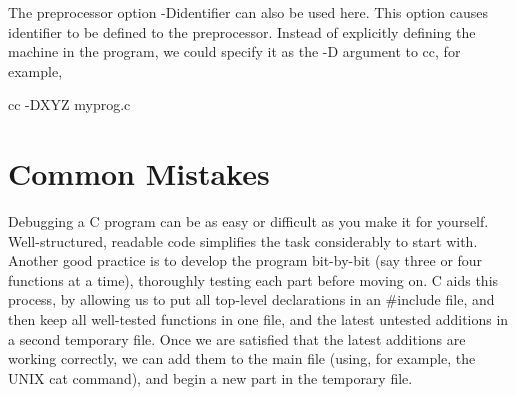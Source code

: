     The preprocessor option {\cmd -D}{\ms identifier\/} can also be
used here. This option causes {\ms identifier\/} to be defined to the
preprocessor. Instead of explicitly defining the  machine in  the
program,  we could specify it as the {\cmd -D} argument to {\cmd cc}, 
for example, 
\begin{display}\cmd
 cc -DXYZ myprog.c
\end{display}
     

\section{Common Mistakes}
     Debugging a  C program  can be  as easy  or difficult  as you
make it for yourself. Well-structured,  readable code  simplifies the
task considerably to start with.  Another good  practice is  to
develop the program bit-by-bit (say three or four functions at a
time), thoroughly testing each part before moving on. C  aids this 
process, by allowing us to put all top-level declarations in an {\cd
\#include} file, and then keep all well-tested functions in one file,
and the latest untested  additions in  a second  temporary file. Once
we are satisfied that the  latest additions  are working correctly,
we can add them to the main file (using,  for example,  the UNIX {\cmd
cat}  command), and  begin a new part in the temporary file.

